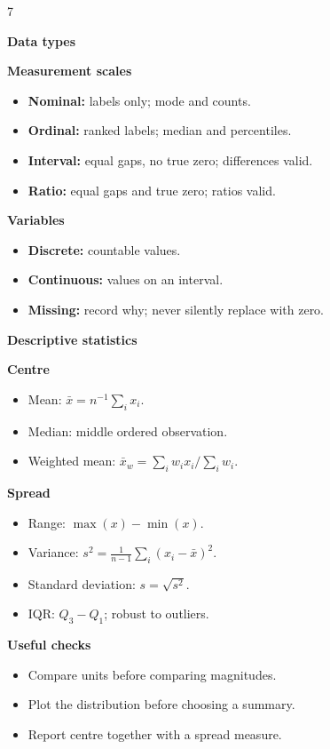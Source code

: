 \documentclass[a4paper,landscape]{article}
\newcommand{\hlhighlight}[1]{\par\smallskip\noindent\colorbox{banner}{\strut\textbf{#1}}\par}
\newcommand{\sectitle}[1]{\par\smallskip\noindent\textcolor{section}{\textbf{#1}}\par}
\newcommand{\concept}[1]{\textcolor{concept}{\textbf{#1}}}
\newcommand{\lbl}[1]{\textcolor{category}{\textbf{#1}}}
\begin{document}
\fontsize{5.5pt}{6.2pt}\selectfont
\raggedright
\begin{multicols}{7}

\hlhighlight{Data types}
\sectitle{Measurement scales}
\begin{itemize}
\item \concept{Nominal:} labels only; mode and counts.
\item \concept{Ordinal:} ranked labels; median and percentiles.
\item \concept{Interval:} equal gaps, no true zero; differences valid.
\item \concept{Ratio:} equal gaps and true zero; ratios valid.
\end{itemize}
\sectitle{Variables}
\begin{itemize}
\item \lbl{Discrete:} countable values.
\item \lbl{Continuous:} values on an interval.
\item \lbl{Missing:} record why; never silently replace with zero.
\end{itemize}

\hlhighlight{Descriptive statistics}
\sectitle{Centre}
\begin{itemize}
\item Mean: $\bar{x}=n^{-1}\sum_i x_i$.
\item Median: middle ordered observation.
\item Weighted mean: $\bar{x}_w=\sum_iw_ix_i/\sum_iw_i$.
\end{itemize}
\sectitle{Spread}
\begin{itemize}
\item Range: $\max(x)-\min(x)$.
\item Variance: $s^2=\frac{1}{n-1}\sum_i(x_i-\bar{x})^2$.
\item Standard deviation: $s=\sqrt{s^2}$.
\item IQR: $Q_3-Q_1$; robust to outliers.
\end{itemize}
\sectitle{Useful checks}
\begin{itemize}
\item Compare units before comparing magnitudes.
\item Plot the distribution before choosing a summary.
\item Report centre together with a spread measure.
\end{itemize}


\end{multicols}
\end{document}
